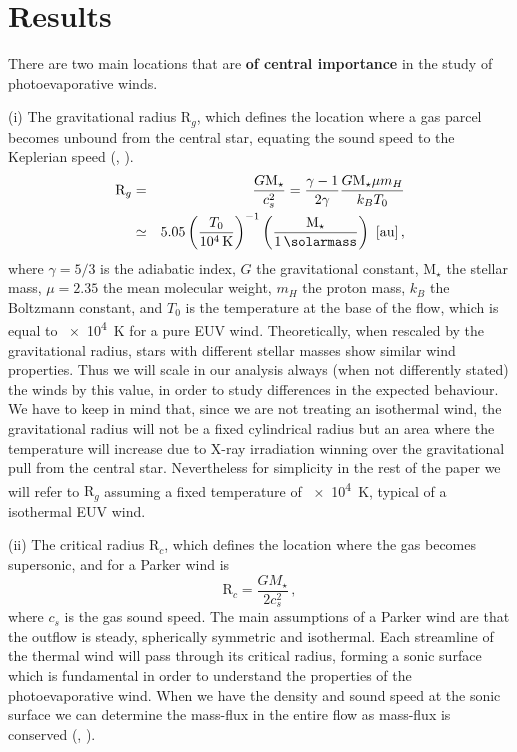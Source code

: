 \documentclass[usenatbib,useAMS,usedcolumn]{mnras}
\begin{document}
\section{Results}\label{sec:results}

There are two main locations that are \textbf{of central importance} in the study of photoevaporative winds.

(i) The gravitational radius $\mathrm{R}_g$, which defines the location where a gas parcel becomes unbound from the central star, equating the sound speed to the Keplerian speed (, ).
\begin{eqnarray}\label{eq:rg}
  \mathrm{R}_g &=& \frac{G \mathrm{M}_\star}{c_s^2} = \frac{\gamma-1}{2\gamma} \frac{G \mathrm{M}_\star \mu m_H}{k_B T_0} \nonumber \\ 
  &\simeq& 5.05 \left(\frac{T_0}{\SI{e4}{\kelvin}}\right)^{-1} \left(\frac{\mathrm{M}_\star}{\SI{1}{\solarmass}}\right) \ [\si{\astronomicalunit}] \,,
\end{eqnarray}
where $\gamma=5/3$ is the adiabatic index, $G$ the gravitational constant, $\mathrm{M}_\star$ the stellar mass, $\mu = 2.35$ the mean molecular weight, $m_H$ the proton mass, $k_B$ the Boltzmann constant, and $T_0$ is the temperature at the base of the flow, which is equal to \SI{e4}{\kelvin} for a pure EUV wind. Theoretically, when rescaled by the gravitational radius, stars with different stellar masses show similar wind properties. Thus we will scale in our analysis always (when not differently stated) the winds by this value, in order to study differences in the expected behaviour. We have to keep in mind that, since we are not treating an isothermal wind, the gravitational radius will not be a fixed cylindrical radius but an area where the temperature will increase due to X-ray irradiation winning over the gravitational pull from the central star. Nevertheless for simplicity in the rest of the paper we will refer to $\mathrm{R}_g$ assuming a fixed temperature of \SI{e4}{K}, typical of a isothermal EUV wind.

(ii) The critical radius $\mathrm{R}_c$, which defines the location where the gas becomes supersonic, and for a Parker wind is 
\begin{equation}\label{eq:rcrit}
    \mathrm{R}_c = \frac{G M_\star}{2 c_s^2}\,,
\end{equation}
where $c_s$ is the gas sound speed. The main assumptions of a Parker wind are that the outflow is steady, spherically symmetric and isothermal. Each streamline of the thermal wind will pass through its critical radius, forming a sonic surface which is fundamental in order to understand the properties of the photoevaporative wind. When we have the density and sound speed at the sonic surface we can determine the mass-flux in the entire flow as mass-flux is conserved (, ).
\end{document}
